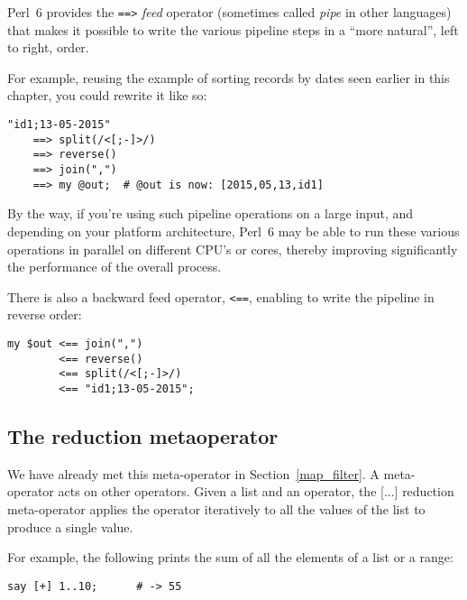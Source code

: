 Perl~6 provides the \verb'==>' \emph{feed} operator 
(sometimes called \emph{pipe} in other languages) 
that makes it possible to write the various pipeline 
steps in a ``more natural'', left to right, order.
\ifplastex \else
{}
\fi

For example, reusing the example of sorting records 
by dates seen earlier in this chapter, you could rewrite 
it like so:

\begin{verbatim}
"id1;13-05-2015" 
    ==> split(/<[;-]>/) 
    ==> reverse() 
    ==> join(",") 
    ==> my @out;  # @out is now: [2015,05,13,id1]
\end{verbatim}

By the way, if you're using such pipeline operations on 
a large input, and depending on your platform 
architecture, Perl~6 may be able to run these 
various operations in parallel on different CPU's or cores, 
thereby improving significantly the performance 
of the overall process.

There is also a backward feed operator, \verb'<==', 
enabling to write the pipeline in reverse order:
\ifplastex \else
{}
\fi

\begin{verbatim}
my $out <== join(",") 
        <== reverse() 
        <== split(/<[;-]>/) 
        <== "id1;13-05-2015";
\end{verbatim}


\subsection{The reduction metaoperator}

We have already met this meta-operator in Section~\ref{map_filter}. 
A meta-operator acts on other operators. Given 
a list and an operator, the [...] reduction meta-operator 
applies the operator iteratively to all the values of the
list to produce a single value.

For example, the following prints the sum of all the 
elements of a list or a range:

\begin{verbatim}
say [+] 1..10;      # -> 55
\end{verbatim}


